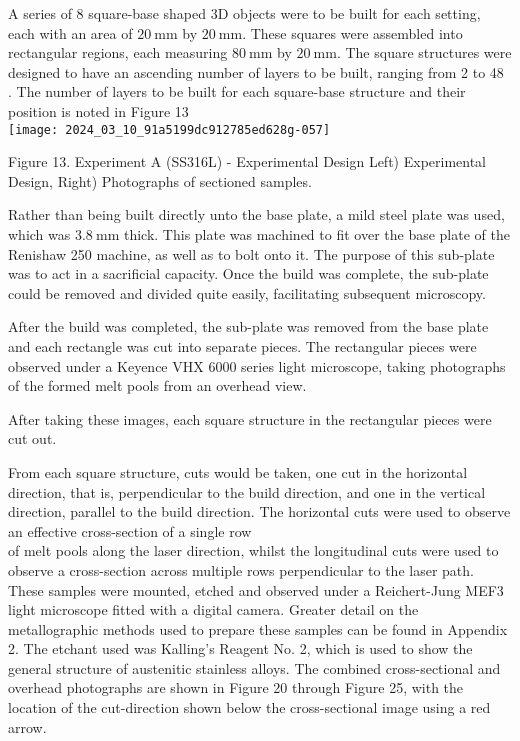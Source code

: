 \documentclass[10pt]{article}
\begin{document}
A series of 8 square-base shaped 3D objects were to be built for each setting, each with an area of $20 \mathrm{~mm}$ by $20 \mathrm{~mm}$. These squares were assembled into rectangular regions, each measuring $80 \mathrm{~mm}$ by $20 \mathrm{~mm}$. The square structures were designed to have an ascending number of layers to be built, ranging from 2 to 48 . The number of layers to be built for each square-base structure and their position is noted in Figure 13\\
\texttt{[image: 2024\_03\_10\_91a5199dc912785ed628g-057]}

Figure 13. Experiment A (SS316L) - Experimental Design Left) Experimental Design, Right) Photographs of sectioned samples.

Rather than being built directly unto the base plate, a mild steel plate was used, which was $3.8 \mathrm{~mm}$ thick. This plate was machined to fit over the base plate of the Renishaw 250 machine, as well as to bolt onto it. The purpose of this sub-plate was to act in a sacrificial capacity. Once the build was complete, the sub-plate could be removed and divided quite easily, facilitating subsequent microscopy.

After the build was completed, the sub-plate was removed from the base plate and each rectangle was cut into separate pieces. The rectangular pieces were observed under a Keyence VHX 6000 series light microscope, taking photographs of the formed melt pools from an overhead view.

After taking these images, each square structure in the rectangular pieces were cut out.

From each square structure, cuts would be taken, one cut in the horizontal direction, that is, perpendicular to the build direction, and one in the vertical direction, parallel to the build direction. The horizontal cuts were used to observe an effective cross-section of a single row\\
of melt pools along the laser direction, whilst the longitudinal cuts were used to observe a cross-section across multiple rows perpendicular to the laser path. These samples were mounted, etched and observed under a Reichert-Jung MEF3 light microscope fitted with a digital camera. Greater detail on the metallographic methods used to prepare these samples can be found in Appendix 2. The etchant used was Kalling's Reagent No. 2, which is used to show the general structure of austenitic stainless alloys. The combined cross-sectional and overhead photographs are shown in Figure 20 through Figure 25, with the location of the cut-direction shown below the cross-sectional image using a red arrow.
\end{document}
